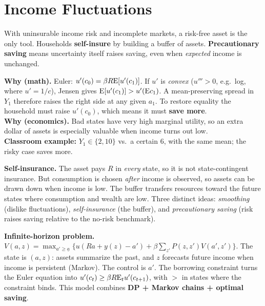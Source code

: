 \documentclass[10pt]{article}
\begin{document}
\section{Income Fluctuations}

\begin{bigidea}
With uninsurable income risk and incomplete markets, a risk-free asset is the only tool. Households \textbf{self-insure} by building a buffer of assets. \textbf{Precautionary saving} means uncertainty itself raises saving, even when \emph{expected} income is unchanged.
\end{bigidea}

\begin{minipage}{0.55\textwidth}
\textbf{Why (math).} Euler: $u'(c_0)=\beta R\mathrm{E}[u'(c_1)]$. If $u'$ is \emph{convex} ($u'''>0$, e.g.\ log, where $u'=1/c$), Jensen gives $\mathrm{E}[u'(c_1)]>u'(\mathrm{E} c_1)$. A mean-preserving spread in $Y_1$ therefore raises the right side at any given $a_1$. To restore equality the household must raise $u'(c_0)$, which means it must \textbf{save more}.\\
\textbf{Why (economics).} Bad states have very high marginal utility, so an extra dollar of assets is especially valuable when income turns out low.\\
\textbf{Classroom example:} $Y_1\in\{2,10\}$ vs.\ a certain $6$, with the same mean; the risky case saves more.
\end{minipage}\hfill
\begin{minipage}{0.42\textwidth}\centering
\figPrecaution
\end{minipage}

\textbf{Self-insurance.} The asset pays $R$ in \emph{every} state, so it is not state-contingent insurance. But consumption is chosen \emph{after} income is observed, so assets can be drawn down when income is low. The buffer transfers resources toward the future states where consumption and wealth are low. Three distinct ideas: \emph{smoothing} (dislike fluctuations), \emph{self-insurance} (the buffer), and \emph{precautionary saving} (risk raises saving relative to the no-risk benchmark).

\textbf{Infinite-horizon problem.} $V(a,z)=\max_{a'\ge\underline a}\{u(Ra+y(z)-a')+\beta\sum_{z'}P(z,z')V(a',z')\}$. The state is $(a,z)$: assets summarize the past, and $z$ forecasts future income when income is persistent (Markov). The control is $a'$. The borrowing constraint turns the Euler equation into $u'(c_t)\ge\beta R\mathrm{E}_tu'(c_{t+1})$, with $>$ in states where the constraint binds. This model combines \textbf{DP + Markov chains + optimal saving}.
\end{document}
